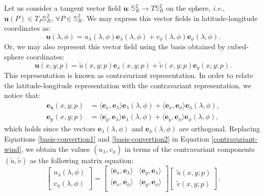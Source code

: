 Let us consider a tangent vector field $\boldsymbol{u}: \mathbb{S}^2_R \to 
T\mathbb{S}_R^2$ on the sphere, \textit{i.e.}, 
$\boldsymbol{u}(P) \in T_P\mathbb{S}^2_R$, $\forall P \in \mathbb{S}^2_R$.
We may express this vector fields in latitude-longitude coordinates as:
\begin{equation}
	\label{latlon-wind}
	\boldsymbol{u}(\lambda, \phi) = 
        u_{\lambda} (\lambda, \phi) \boldsymbol{e}_{\lambda} (\lambda, \phi) + 
	v_{\phi} (\lambda, \phi) \boldsymbol{e}_{\phi} (\lambda, \phi). 
\end{equation}
Or, we may also represent this vector field using the basis 
obtained by cubed-sphere coordinates:
\begin{equation}
	\label{contravariant-wind}
	\boldsymbol{u}(x, y; p) = 
	\tilde{u}(x, y; p) \boldsymbol{e}_{x}(x, y; p) + 
	\tilde{v}(x, y; p) \boldsymbol{e}_{y}(x, y; p).
\end{equation}
This representation is known as contravariant representation.
In order to relate the latitude-longitude representation
with the contravariant representation, we notice that:
\begin{align}
	\label{basis-convertion1}
	\boldsymbol{e_{x}}(x, y; p) &= 
	\langle \boldsymbol{e}_{x} , \boldsymbol{e}_{\lambda}\rangle
	\boldsymbol{e}_{\lambda} (\lambda, \phi)  
	+ \langle \boldsymbol{e}_{x} , \boldsymbol{e}_{\phi}\rangle
	\boldsymbol{e}_{\phi} (\lambda, \phi), \\
	\label{basis-convertion2}
	\boldsymbol{e_{y}}(x, y; p) &=  
	\langle \boldsymbol{e}_{y} , \boldsymbol{e}_{\lambda}\rangle
	  \boldsymbol{e}_{\lambda} (\lambda, \phi) 
	+ \langle \boldsymbol{e}_{y} , \boldsymbol{e}_{\phi}\rangle
	\boldsymbol{e}_{\phi} (\lambda, \phi), 
\end{align}
which holds since the vectors $\boldsymbol{e}_{\lambda}(\lambda, \phi)$ and
$\boldsymbol{e}_{\phi}(\lambda, \phi)$ are orthogonal.
Replacing Equations \eqref{basis-convertion1} and \eqref{basis-convertion2}
in Equation \eqref{contravariant-wind}, we obtain the values $(u_\lambda, v_\phi)$
in terms of the contravariant components $(\tilde{u}, \tilde{v})$ 
as the following matrix equation:
\begin{equation}
	\label{ll-to-contravariant}
	\begin{bmatrix}
		 u_\lambda (\lambda, \phi) \\
		 v_\phi (\lambda, \phi) 
	\end{bmatrix}
	=
	\begin{bmatrix}
		\langle \boldsymbol{e}_x, \boldsymbol{e}_\lambda \rangle 
		& \langle \boldsymbol{e}_y, \boldsymbol{e}_\lambda \rangle \\
		\langle \boldsymbol{e}_x, \boldsymbol{e}_\phi \rangle 
		& \langle \boldsymbol{e}_y, \boldsymbol{e}_\phi \rangle \\
	\end{bmatrix}
	\begin{bmatrix}
		\tilde{u}(x,y;p) \\
		\tilde{v}(x,y;p)
	\end{bmatrix}.
\end{equation}
